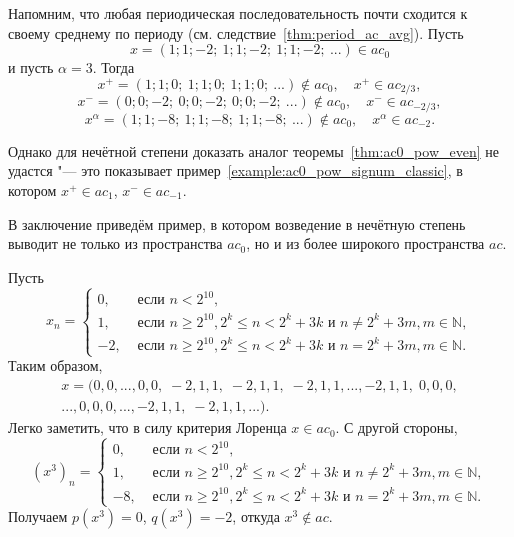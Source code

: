 \begin{example}
	Напомним,
	что любая периодическая последовательность почти сходится к своему среднему по периоду
	(см. следствие~\ref{thm:period_ac_avg}).
	Пусть
	\begin{equation}
		x = (1;1;-2;\ 1;1;-2;\ 1;1;-2;\ ...) \in ac_0
	\end{equation}
	и пусть $\alpha = 3$.
	Тогда
	\begin{equation}
		x^+ = (1;1;0;\ 1;1;0;\ 1;1;0;\ ...) \notin ac_0, \quad x^+ \in ac_{2/3}
		,
	\end{equation}
	\begin{equation}
		x^- = (0;0;-2;\ 0;0;-2;\ 0;0;-2;\ ...) \notin ac_0, \quad x^- \in ac_{-2/3}
		,
	\end{equation}
	\begin{equation}
		x^\alpha = (1;1;-8;\ 1;1;-8;\ 1;1;-8;\ ...) \notin ac_0, \quad x^\alpha \in ac_{-2}
		.
	\end{equation}
\end{example}

Однако для нечётной степени доказать аналог теоремы~\ref{thm:ac0_pow_even} не удастся "--- это показывает пример~\ref{example:ac0_pow_signum_classic}, в котором $x^+\in ac_1$, $x^-\in ac_{-1}$.

В заключение приведём пример, в котором возведение в нечётную степень выводит не только из пространства $ac_0$,
но и из более широкого пространства $ac$.

\begin{example}
	\label{example:cube_out_of_ac0}
	Пусть
	\begin{equation}
		x_n = \begin{cases}
			 0, & \mbox{~если~} n < 2^{10},
			\\
			 1, & \mbox{~если~} n \ge 2^{10}, 2^k\le n < 2^k+3k \mbox{~и~}  n\neq 2^k + 3m, m\in\mathbb{N},
			\\
			-2, & \mbox{~если~} n \ge 2^{10}, 2^k\le n < 2^k+3k \mbox{~и~}  n  =  2^k + 3m, m\in\mathbb{N}.
		\end{cases}
	\end{equation}
	Таким образом,
	\begin{multline}
		x = (0,0,...,0,0, \; -2, 1, 1, \; -2, 1, 1, \; -2, 1, 1, ..., -2, 1, 1, \; 0, 0, 0, \\ ..., 0, 0, 0, ..., -2, 1, 1, \; -2, 1, 1, ... )
		.
	\end{multline}
	Легко заметить, что в силу критерия Лоренца $x\in ac_0$.
	С другой стороны,
		\begin{equation}
		(x^3)_n = \begin{cases}
			 0, & \mbox{~если~} n < 2^{10},
			\\
			 1, & \mbox{~если~} n \ge 2^{10}, 2^k\le n < 2^k+3k \mbox{~и~}  n\neq 2^k + 3m, m\in\mathbb{N},
			\\
			-8, & \mbox{~если~} n \ge 2^{10}, 2^k\le n < 2^k+3k \mbox{~и~}  n  =  2^k + 3m, m\in\mathbb{N}.
		\end{cases}
	\end{equation}
	Получаем $p(x^3) = 0$, $q(x^3) = -2$, откуда $x^3 \notin ac$.
\end{example}

